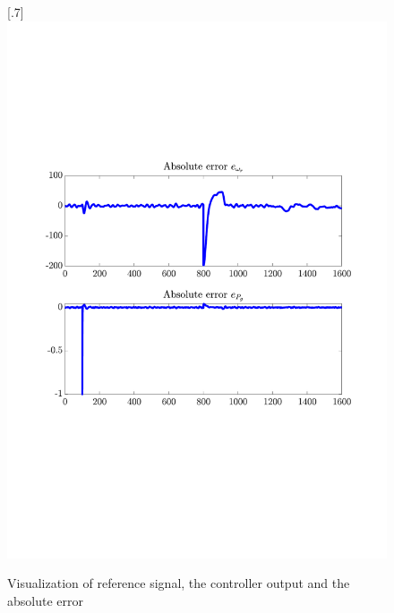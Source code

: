 \begin{figure}[H]
[.7\textwidth]{\includegraphics[width=1\linewidth, scale=1, trim=55 230 55 120,clip]{fig/Open_loop/exp_10_error.pdf}}
    \caption{Visualization of reference signal, the controller output and the absolute error}
    \label{fig:app:cl_results:exp10}
\end{figure}